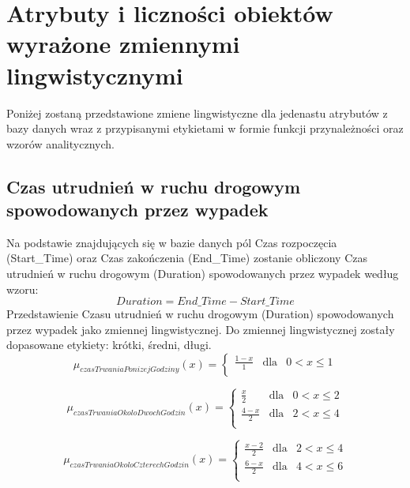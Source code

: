 \documentclass{classrep}
\begin{document}
\section{Atrybuty i liczności obiektów wyrażone zmiennymi lingwistycznymi}

Poniżej zostaną przedstawione zmiene lingwistyczne \cite{niewiadomskiRozmyte} dla jedenastu atrybutów z bazy danych wraz z przypisanymi etykietami w formie funkcji przynależności oraz wzorów analitycznych. \\

\subsection{Czas utrudnień w ruchu drogowym spowodowanych przez wypadek}
Na podstawie znajdujących się w bazie danych pól Czas rozpoczęcia (Start\_Time) oraz Czas zakończenia (End\_Time) zostanie obliczony Czas utrudnień w ruchu drogowym (Duration) spowodowanych przez wypadek według wzoru:
\begin{equation}
Duration = End\_Time - Start\_Time
\end{equation}
Przedstawienie Czasu utrudnień w ruchu drogowym (Duration) spowodowanych przez wypadek jako zmiennej lingwistycznej. Do zmiennej lingwistycznej zostały dopasowane etykiety: krótki, średni, długi. 
\begin{equation}
\mu _{czasTrwaniaPonizejGodziny}(x) =  \left\{ \begin{array}{rcl}
\frac{1 - x}{1} & \mbox{dla} & 0 < x \leq 1\\
\end{array}\right.
\end{equation}

\begin{equation}
\mu _{czasTrwaniaOkoloDwochGodzin}(x) =  \left\{ \begin{array}{rcl}
\frac{x}{2} & \mbox{dla} & 0 < x \leq 2\\
\frac{4 - x}{2} & \mbox{dla} & 2 < x \leq 4\\
\end{array}\right.
\end{equation}

\begin{equation}
\mu _{czasTrwaniaOkoloCzterechGodzin}(x) =  \left\{ \begin{array}{rcl}
\frac{x - 2}{2} & \mbox{dla} & 2 < x \leq 4\\
\frac{6 - x}{2} & \mbox{dla} & 4 < x \leq 6\\
\end{array}\right.
\end{equation}
\end{document}
